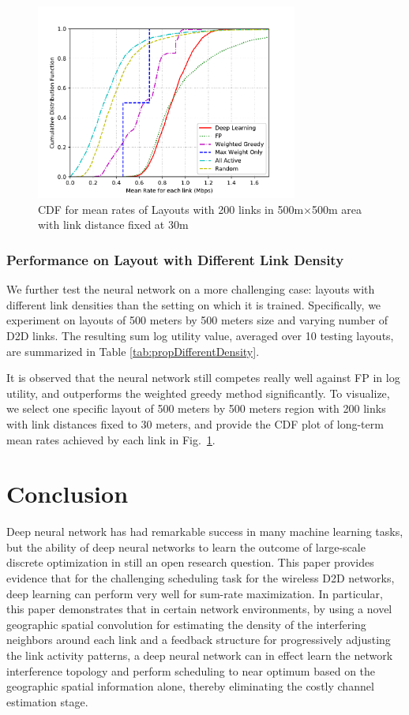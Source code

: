 \documentclass[journal,12pt,onecolumn,draftclsnofoot,]{IEEEtran}
\begin{document}
\begin{figure}
    \centering
    \includegraphics[width=8.6cm]{fig/MeanRatesCDF_all30_500m_200pairs}
    \caption{CDF for mean rates of Layouts with 200 links in 500m$\times$500m
area with link distance fixed at 30m}
    \label{fig:meanratescdf_varydensity}
\end{figure}

\subsubsection{Performance on Layout with Different Link Density}

We further test the neural network on a more challenging case: layouts with
different link densities than the setting on which it is trained.
Specifically, we experiment on layouts of 500 meters by 500 meters size and
varying number of D2D links. The resulting sum log utility value, averaged
over 10 testing layouts, are summarized in Table \ref{tab:propDifferentDensity}.

It is observed that the neural network still competes really well against FP in
log utility, and outperforms the weighted greedy method significantly.
To visualize, we select one specific layout of 500 meters by 500 meters
region with 200 links with link distances fixed to 30 meters, and provide
the CDF plot of long-term mean rates achieved by each link in
Fig.~\ref{fig:meanratescdf_varydensity}.

\section{Conclusion}

Deep neural network has had remarkable success in many machine learning tasks,
but the ability of deep neural networks to learn the outcome of large-scale
discrete optimization in still an open research question. This paper
provides evidence that for the challenging scheduling task for the wireless D2D
networks, deep learning can perform very well for sum-rate maximization.  
In particular, this paper demonstrates that in certain network environments, 
by using a novel geographic spatial
convolution for estimating the density of the interfering neighbors around each
link and a feedback structure for progressively adjusting the link activity
patterns, a deep neural network can in effect learn the network interference
topology and perform scheduling to near optimum based on the geographic spatial
information alone, thereby eliminating the costly channel estimation stage.
\end{document}
